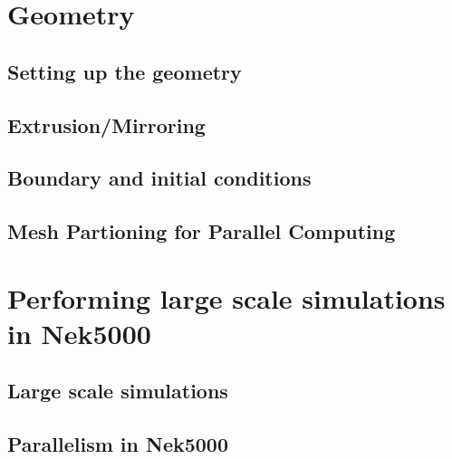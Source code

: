 \documentclass[11pt]{report}              %
\begin{document}




\chapter{Geometry}\label{sec:geom}

\section{Setting up the geometry}
\label{sec:genbox}
%
\section{Extrusion/Mirroring}


\section{Boundary and initial conditions}



\section{Mesh Partioning for Parallel Computing}


\chapter{Performing large scale simulations  in Nek5000}
\section{Large scale simulations}

\section{Parallelism in Nek5000}

\end{document}
